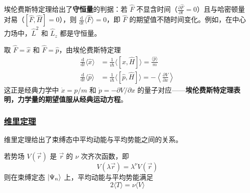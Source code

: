 \begin{remark}
    埃伦费斯特定理给出了\textbf{守恒量}的判据：若 $\hat{F}$ 不显含时间（$\frac{\partial\hat{F}}{\partial t} = 0$）且与哈密顿量对易（$[\hat{F}, \hat{H}] = 0$），则 $\frac{\mathrm{d}}{\mathrm{d}t}\langle \hat{F} \rangle = 0$，即 $\hat{F}$ 的期望值不随时间变化。例如，在中心力场中，$\hat{L}^2$ 和 $\hat{L}_z$ 都是守恒量。
\end{remark}

\begin{example}[经典极限]
    取 $\hat{F} = \hat{x}$ 和 $\hat{F} = \hat{p}$，由埃伦费斯特定理
    \begin{align}
        \frac{\mathrm{d}}{\mathrm{d}t}\langle \hat{x} \rangle &= \frac{1}{i\hbar}\langle [\hat{x}, \hat{H}] \rangle = \frac{\langle \hat{p} \rangle}{m} \\
        \frac{\mathrm{d}}{\mathrm{d}t}\langle \hat{p} \rangle &= \frac{1}{i\hbar}\langle [\hat{p}, \hat{H}] \rangle = -\left\langle \frac{\partial V}{\partial x} \right\rangle
    \end{align}
    这正是经典力学中 $\dot{x} = p/m$ 和 $\dot{p} = -\partial V/\partial x$ 的量子对应——\textbf{埃伦费斯特定理表明，力学量的期望值服从经典运动方程}。
\end{example}

\subsubsection{\protect\hyperlink{:}{维里定理}}

维里定理给出了束缚态中平均动能与平均势能之间的关系。

\begin{theorem}[维里定理]
    若势场 $V(\vec{r})$ 是 $\vec{r}$ 的 $\nu$ 次齐次函数，即
    \begin{equation}
        V(\lambda\vec{r}) = \lambda^\nu V(\vec{r})
    \end{equation}
    则在束缚定态 $\ket{\Psi_n}$ 上，平均动能与平均势能满足
    \begin{equation}
        2\langle T \rangle = \nu\langle V \rangle
    \end{equation}
\end{theorem}

